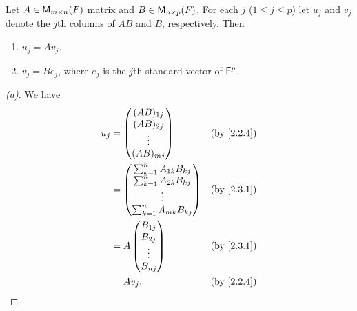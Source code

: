 \begin{thm}\label{2.13}
  Let \(A \in \mathsf{M}_{{m} \times n}({\mathit{F}})\) matrix and \(B \in \mathsf{M}_{{n} \times p}({\mathit{F}})\).
  For each \(j\) (\(1 \leq j \leq p\)) let \(u_j\) and \(v_j\) denote the \(j\)th columns of \(AB\) and \(B\), respectively.
  Then
  \begin{enumerate}
    \item \(u_j = A v_j\).
    \item \(v_j = B e_j\), where \(e_j\) is the \(j\)th standard vector of \(\mathsf{F}^p\).
  \end{enumerate}
\end{thm}

\begin{proof}[(a)]
  We have
  \begin{align*}
    u_j & = \begin{pmatrix}
              (AB)_{1 j} \\
              (AB)_{2 j} \\
              \vdots     \\
              (AB)_{m j}
            \end{pmatrix}                 &  & \text{(by \cref{2.2.4})}   \\
        & = \begin{pmatrix}
              \sum_{k = 1}^n A_{1 k} B_{k j} \\
              \sum_{k = 1}^n A_{2 k} B_{k j} \\
              \vdots                         \\
              \sum_{k = 1}^n A_{m k} B_{k j}
            \end{pmatrix} &  & \text{(by \cref{2.3.1})}                   \\
        & = A \begin{pmatrix}
                B_{1 j} \\
                B_{2 j} \\
                \vdots  \\
                B_{n j}
              \end{pmatrix}               &  & \text{(by \cref{2.3.1})}   \\
        & = A v_j.                          &  & \text{(by \cref{2.2.4})}
  \end{align*}
\end{proof}

